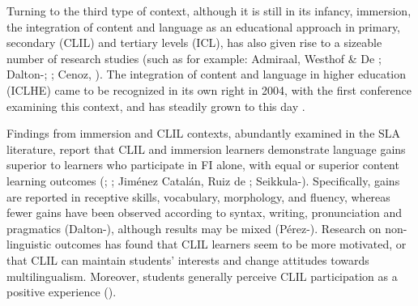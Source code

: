 Turning to the third type of context, although it is still in its infancy, immersion, the integration of content and language as an educational approach in primary, secondary (CLIL) and tertiary levels (ICL), has also given rise to a sizeable number of research studies (such as for example: Admiraal, Westhof \& De \citealt{Boot2006}; Dalton-\citealt{Puffer2008}; \citealt{Airey2012}; Cenoz, \citealt{GeneseeGörter2014}). The integration of content and language in higher education (ICLHE) came to be recognized in its own right in 2004, with the first conference examining this context, and has steadily grown to this day \citep{Wilkinson2004}. 

Findings from immersion and CLIL contexts, abundantly examined in the SLA literature, report that CLIL and immersion learners demonstrate language gains superior to learners who participate in FI alone, with equal or superior content learning outcomes (\citealt{WescheSkehan2002}; \citealt{Genesee2004}; Jiménez Catalán, Ruiz de \citealt{ZarobeCenoz2006}; Seikkula-\citealt{Leino2007}). Specifically, gains are reported in receptive skills, vocabulary, morphology, and fluency, whereas fewer gains have been observed according to syntax, writing, pronunciation and pragmatics (Dalton-\citealt{Puffer2008}), although results may be mixed (Pérez-\citealt{VidalRoquet2014}). Research on non-linguistic outcomes has found that CLIL learners seem to be more motivated, or that CLIL can maintain students’ interests and change attitudes towards multilingualism. Moreover, students generally perceive CLIL participation as a positive experience (\citealt{LasagabasterSierra2009}). 

